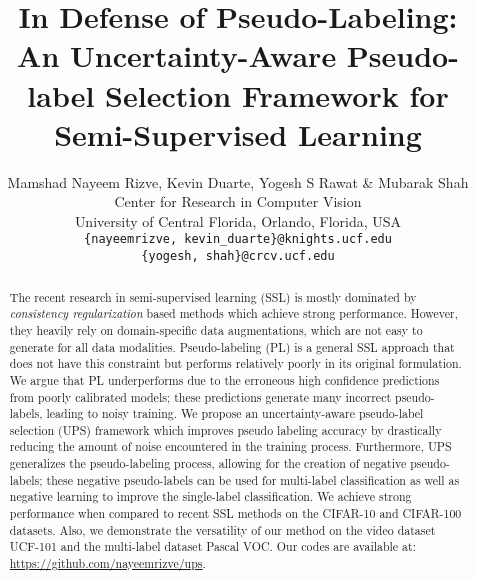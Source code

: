 \documentclass{article} \usepackage{iclr2021_conference,times}
\title{In Defense of Pseudo-Labeling: \\An Uncertainty-Aware Pseudo-label Selection Framework for Semi-Supervised Learning 
}
\author{Mamshad Nayeem Rizve\IEEEauthorrefmark2, Kevin Duarte\IEEEauthorrefmark2, Yogesh S Rawat\IEEEauthorrefmark3 \& Mubarak Shah\IEEEauthorrefmark3 \\
Center for Research in Computer Vision\\
University of Central Florida, Orlando, Florida, USA\\
\texttt{\IEEEauthorrefmark2\{nayeemrizve, kevin\_duarte\}@knights.ucf.edu} \\
\texttt{\IEEEauthorrefmark3\{yogesh, shah\}@crcv.ucf.edu} \\
}
\begin{document}
\maketitle

\begin{abstract}
The recent research in semi-supervised learning (SSL) is mostly dominated by {\em consistency regularization} based methods which achieve strong performance. However, they heavily rely on domain-specific data augmentations, which are not easy to generate for all data modalities. Pseudo-labeling (PL) is a general SSL approach that does not have this constraint but performs relatively poorly in its original formulation. We argue that PL underperforms due to the erroneous high confidence predictions from poorly calibrated models; these predictions generate many incorrect pseudo-labels, leading to noisy training. We propose an uncertainty-aware pseudo-label selection (UPS) framework which improves pseudo labeling accuracy by drastically reducing the amount of noise encountered in the training process. Furthermore, UPS generalizes the pseudo-labeling process, allowing for the creation of negative pseudo-labels; these negative pseudo-labels can be used for multi-label classification as well as negative learning to improve the single-label classification. We achieve strong performance when compared to recent SSL methods on the CIFAR-10 and CIFAR-100 datasets. Also, we demonstrate the versatility of our method on the video dataset UCF-101 and the multi-label dataset Pascal VOC. Our codes are available at: \url{https://github.com/nayeemrizve/ups}.



\end{abstract}






\iffalse 




Recent consistency regularization methods tend to outperform pseudo-labeling based approaches in semi-supervised learning; however, these methods heavily rely on domain-specific data augmentations, which are not easy to generate for all data modalities. We attempt to bridge this performance gap by proposing a novel uncertainty-aware pseudo-labeling selection (UPS) framework that does not inherently rely on this rich set of data augmentations. Current pseudo-labeling methods fail because erroneous predictions from poorly calibrated models generate many incorrect pseudo-labels, leading to noisy training. We leverage prediction uncertainty to drastically reduce the number of incorrect pseudo-labels encountered during training. Furthermore, UPS is a general extension of pseudo-labeling that allows for the creation of negative pseudo-labels, which can be used for multi-label classification as well as negative learning to improve single-label classification. We achieve strong performance when compared to recent SSL methods on the CIFAR-10 and CIFAR-100 datasets. Also, we demonstrate the versatility of our method on the multi-label dataset Pascal VOC and the video dataset UCF-101. \textit{Code will be made publicly available.}
\fi
\end{document}

